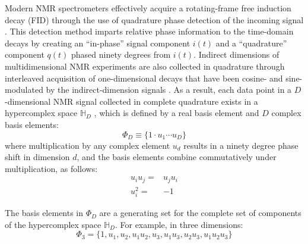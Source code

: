 \begin{doublespace}
Modern NMR spectrometers effectively acquire a rotating-frame free induction
decay (FID) through the use of quadrature phase detection of the incoming
signal \cite{levitt2008}. This detection method imparts relative phase
information to the time-domain decays by creating an ``in-phase'' signal
component $i(t)$ and a ``quadrature'' component $q(t)$ phased ninety degrees
from $i(t)$. Indirect dimensions of multidimensional NMR experiments are also
collected in quadrature through interleaved acquisition of one-dimensional
decays that have been cosine- and sine-modulated by the indirect-dimension
signals \cite{states:jmr1982}. As a result, each data point in a
$D$-dimensional NMR signal collected in complete quadrature exists in a
hypercomplex space $\mathbb{H}_D$ \cite{schuyler:jmr2013}, which is defined by
a real basis element and $D$ complex basis elements:
\begin{equation}
\Phi_D \equiv \{ 1 \cdot u_1 \cdots u_D \}
\end{equation}
where multiplication by any complex element $u_d$ results in a ninety degree
phase shift in dimension $d$, and the basis elements combine commutatively
under multiplication, as follows:
\begin{align}
u_i u_j =& u_j u_i \\
u_i^2 =& -1
\end{align}

The basis elements in $\Phi_D$ are a generating set for the complete set of
components of the hypercomplex space $\mathbb{H}_D$. For example, in three
dimensions:
\begin{equation}
\Phi_3 = \{ 1, u_1, u_2, u_1 u_2, u_3, u_1 u_3, u_2 u_3, u_1 u_2 u_3 \}
\end{equation}


\end{doublespace}
